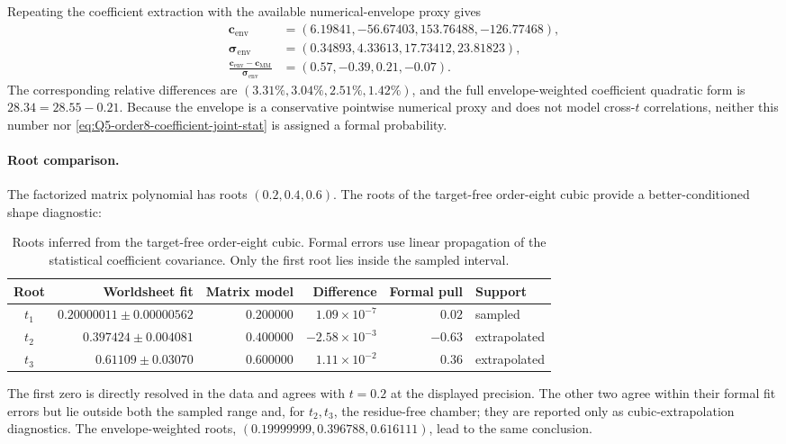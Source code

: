 \documentclass[11pt]{article}
\begin{document}
Repeating the coefficient extraction with the available numerical-envelope
proxy gives
\begin{align}
 \boldsymbol c_{\mathrm{env}}
   &=(6.19841,-56.67403,153.76488,-126.77468),\\
 \boldsymbol\sigma_{\mathrm{env}}
   &=(0.34893,4.33613,17.73412,23.81823),\\
 \frac{\boldsymbol c_{\mathrm{env}}-\boldsymbol c_{\mathrm{MM}}}
        {\boldsymbol\sigma_{\mathrm{env}}}
   &=(0.57,-0.39,0.21,-0.07).
 \label{eq:Q5-order8-coefficient-envelope}
\end{align}
The corresponding relative differences are
$(3.31\%,3.04\%,2.51\%,1.42\%)$, and the full envelope-weighted coefficient
quadratic form is $28.34=28.55-0.21$.  Because the envelope is a conservative
pointwise numerical proxy and does not model cross-$t$ correlations, neither
this number nor \eqref{eq:Q5-order8-coefficient-joint-stat} is assigned a
formal probability.

\paragraph{Root comparison.}
The factorized matrix polynomial has roots $(0.2,0.4,0.6)$.  The roots of the
target-free order-eight cubic provide a better-conditioned shape diagnostic:
\begin{table}[H]
\centering
\small
\caption{Roots inferred from the target-free order-eight cubic.  Formal
errors use linear propagation of the statistical coefficient covariance.
Only the first root lies inside the sampled interval.}
\label{tab:Q5-order8-roots}
\begin{tabular}{@{}c r r r r l@{}}
\toprule
Root & Worldsheet fit & Matrix model & Difference & Formal pull & Support \\
\midrule
$t_1$ & $0.20000011\pm0.00000562$ & $0.200000$ & $ 1.09\times10^{-7}$ & $ 0.02$ & sampled \\
$t_2$ & $0.397424\pm0.004081$      & $0.400000$ & $-2.58\times10^{-3}$ & $-0.63$ & extrapolated \\
$t_3$ & $0.61109\pm0.03070$        & $0.600000$ & $ 1.11\times10^{-2}$ & $ 0.36$ & extrapolated \\
\bottomrule
\end{tabular}
\end{table}
The first zero is directly resolved in the data and agrees with $t=0.2$ at
the displayed precision.  The other two agree within their formal fit errors
but lie outside both the sampled range and, for $t_2,t_3$, the residue-free
chamber; they are reported only as cubic-extrapolation diagnostics.  The
envelope-weighted roots, $(0.19999999,0.396788,0.616111)$, lead to the same
conclusion.
\end{document}
